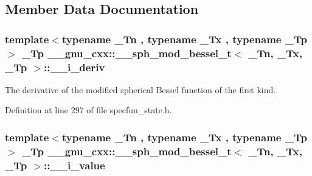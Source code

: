 \subsection{Member Data Documentation}
\subsubsection[{\texorpdfstring{\+\_\+\+\_\+i\+\_\+deriv}{__i_deriv}}]{\setlength{\rightskip}{0pt plus 5cm}template$<$typename \+\_\+\+Tn , typename \+\_\+\+Tx , typename \+\_\+\+Tp $>$ \+\_\+\+Tp {\bf \+\_\+\+\_\+gnu\+\_\+cxx\+::\+\_\+\+\_\+sph\+\_\+mod\+\_\+bessel\+\_\+t}$<$ \+\_\+\+Tn, \+\_\+\+Tx, \+\_\+\+Tp $>$\+::\+\_\+\+\_\+i\+\_\+deriv}\hypertarget{struct____gnu__cxx_1_1____sph__mod__bessel__t_a362ea0ef3a2a7e941e3882bb03477f0f}{}\label{struct____gnu__cxx_1_1____sph__mod__bessel__t_a362ea0ef3a2a7e941e3882bb03477f0f}


The derivative of the modified spherical Bessel function of the first kind. 



Definition at line 297 of file specfun\+\_\+state.\+h.

\subsubsection[{\texorpdfstring{\+\_\+\+\_\+i\+\_\+value}{__i_value}}]{\setlength{\rightskip}{0pt plus 5cm}template$<$typename \+\_\+\+Tn , typename \+\_\+\+Tx , typename \+\_\+\+Tp $>$ \+\_\+\+Tp {\bf \+\_\+\+\_\+gnu\+\_\+cxx\+::\+\_\+\+\_\+sph\+\_\+mod\+\_\+bessel\+\_\+t}$<$ \+\_\+\+Tn, \+\_\+\+Tx, \+\_\+\+Tp $>$\+::\+\_\+\+\_\+i\+\_\+value}\hypertarget{struct____gnu__cxx_1_1____sph__mod__bessel__t_abecb364caffb1f335806b71c2f729d0d}{}\label{struct____gnu__cxx_1_1____sph__mod__bessel__t_abecb364caffb1f335806b71c2f729d0d}


